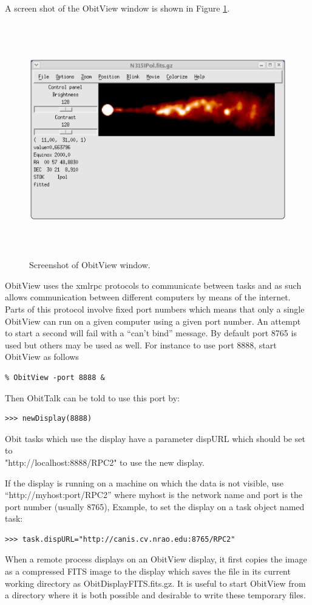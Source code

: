 \documentclass[11pt]{report}
\begin{document}
A screen shot of the ObitView window is shown in Figure \ref{ObitViewFig}.
\begin{figure}
\centering
\includegraphics[height=4in]{ObitView.eps}
\caption{ 
Screenshot of ObitView window.
}
\label{ObitViewFig}
\end{figure}

ObitView uses the xmlrpc protocols to communicate between tasks and as
such allows communication between different computers by means of the
internet.
Parts of this protocol involve fixed port numbers which means that only
a single ObitView can run on a given computer using a given port
number.
An attempt to start a second will fail with a ``can't bind'' message.
By default port 8765 is used but others may be used as well.
For instance to use port 8888, start ObitView as follows
\begin{verbatim}
% ObitView -port 8888 &
\end{verbatim}
Then ObitTalk can be told to use this port by:
\begin{verbatim}
>>> newDisplay(8888)
\end{verbatim}
Obit tasks which use the display have a parameter dispURL which should
be set to\\
"http://localhost:8888/RPC2" to use the new display.

If the display is running on a machine on which the data is not
visible, use ``http://myhost:port/RPC2'' where myhost is the network
name and port is the port number (usually 8765), Example, to set
the display on a task object named task:
\begin{verbatim}
>>> task.dispURL="http://canis.cv.nrao.edu:8765/RPC2"
\end{verbatim}
When a remote process displays on an ObitView display, it first copies
the image as a compressed FITS image to the display which saves the
file in its current working directory as ObitDisplayFITS.fits.gz.
It is useful to start ObitView from a directory where it is both
possible and desirable to write these temporary files.
\end{document}
